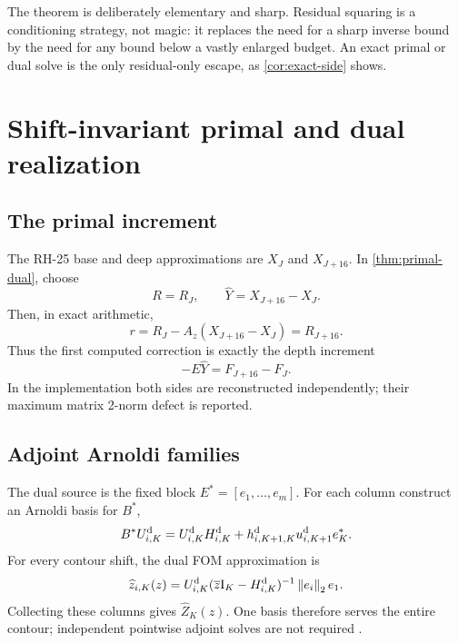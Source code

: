 \documentclass[11pt]{article}
\theoremstyle{definition}
\theoremstyle{remark}
\newcommand{\Id}{\mathrm I}
\newcommand{\norm}[1]{\left\lVert#1\right\rVert}
\begin{document}
The theorem is deliberately elementary and sharp.  Residual squaring is a
conditioning strategy, not magic: it replaces the need for a sharp inverse
bound by the need for any bound below a vastly enlarged budget.  An exact
primal or dual solve is the only residual-only escape, as
\cref{cor:exact-side} shows.

\section{Shift-invariant primal and dual realization}
\label{sec:realization}

\subsection{The primal increment}

The RH-25 base and deep approximations are \(X_J\) and \(X_{J+16}\).  In
\cref{thm:primal-dual}, choose
\begin{equation}
 R=R_J,
 \qquad
 \widehat Y=X_{J+16}-X_J.
 \label{eq:primal-choice}
\end{equation}
Then, in exact arithmetic,
\begin{equation}
 r=R_J-A_z(X_{J+16}-X_J)=R_{J+16}.
 \label{eq:deep-residual}
\end{equation}
Thus the first computed correction is exactly the depth increment
\begin{equation}
 -E\widehat Y=F_{J+16}-F_J.
 \label{eq:depth-correction}
\end{equation}
In the implementation both sides are reconstructed independently; their
maximum matrix 2-norm defect is reported.

\subsection{Adjoint Arnoldi families}

The dual source is the fixed block \(E^*=[e_1,\ldots,e_m]\).  For each
column construct an Arnoldi basis for \(B^*\),
\begin{equation}
 B^*U_{i,K}^{\rm d}
 =U_{i,K}^{\rm d}H_{i,K}^{\rm d}
 +h_{i,K+1,K}^{\rm d}u_{i,K+1}^{\rm d}e_K^*.
 \label{eq:dual-arnoldi}
\end{equation}
For every contour shift, the dual FOM approximation is
\begin{equation}
 \widehat z_{i,K}(z)=
 U_{i,K}^{\rm d}
 (\overline z\Id_K-H_{i,K}^{\rm d})^{-1}
 \norm{e_i}_2 e_1.
 \label{eq:dual-fom}
\end{equation}
Collecting these columns gives \(\widehat Z_K(z)\).  One basis therefore
serves the entire contour; independent pointwise adjoint solves are not
required \citep{Saad1980,Saad2003}.
\end{document}
